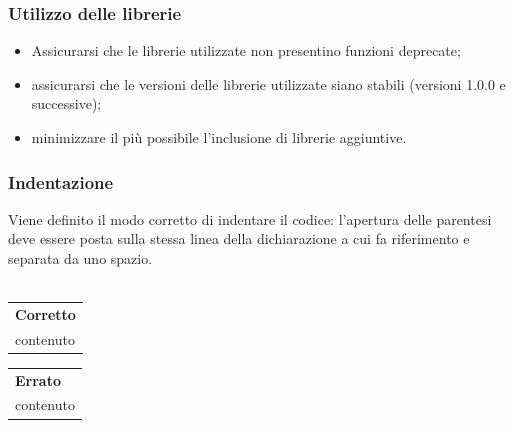 \subsubsection{Utilizzo delle librerie}
\begin{itemize}
	\item Assicurarsi che le librerie utilizzate non presentino funzioni deprecate;
	\item assicurarsi che le versioni delle librerie utilizzate siano stabili (versioni 1.0.0 e successive);
	\item minimizzare il più possibile l'inclusione di librerie aggiuntive.
\end{itemize}

\subsubsection{Indentazione}
Viene definito il modo corretto di indentare il codice: l'apertura delle parentesi deve essere posta sulla stessa linea della dichiarazione a cui fa riferimento e separata da uno spazio.\\\\
\begin{minipage}{0.45\textwidth}
\begin{tabular}{p{\textwidth}}	
	\textbf{Corretto}
	\begin{lstlisting}
	
	private fun Foo() {
	\\contenuto
	}
	
	\end{lstlisting}
\end{tabular}
\end{minipage}
\hfill
\begin{minipage}{0.45\textwidth}
\begin{tabular}{|p{\textwidth}}

\textbf{Errato}
\begin{lstlisting}
	private fun Foo()
	{
	\\contenuto
	}

\end{lstlisting}
\end{tabular}

\end{minipage}


